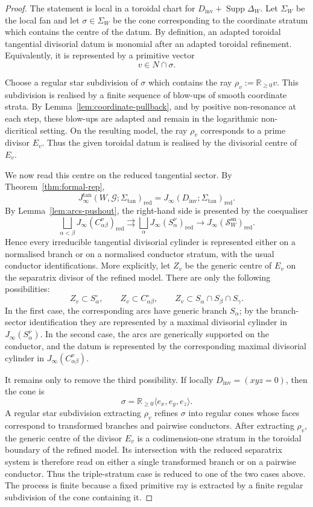 \documentclass[11pt]{amsart}
\numberwithin{equation}{section}
\theoremstyle{plain}
\theoremstyle{definition}
\newcommand{\Supp}{\operatorname{Supp}}
\newcommand{\sn}{\mathrm{sn}}
\newcommand{\Sigmatan}{\Sigma_{\mathrm{tan}}}
\newcommand{\red}{\mathrm{red}}
\newcommand{\Dinv}{D_{\mathrm{inv}}}
\newcommand{\cG}{\mathcal G}
\newcommand{\sS}{\mathscr S}
\begin{document}
 \begin{proof}
The statement is local in a toroidal chart for
\(\Dinv+\Supp\Delta_W\).  Let \(\Sigma_W\) be the local fan and let
\(\sigma\in\Sigma_W\) be the cone corresponding to the coordinate stratum
which contains the centre of the datum.  By definition, an adapted toroidal
tangential divisorial datum is monomial after an adapted toroidal refinement.
Equivalently, it is represented by a primitive vector
\[
v\in N\cap\sigma .
\]

Choose a regular star subdivision of \(\sigma\) which contains the ray
\(\rho_v:=\mathbb R_{\geq0}v\).  This subdivision is realised by a finite
sequence of blow-ups of smooth coordinate strata.  By
Lemma~\ref{lem:coordinate-pullback}, and by positive non-resonance at each
step, these blow-ups are adapted and remain in the logarithmic
non-dicritical setting.  On the resulting model, the ray \(\rho_v\)
corresponds to a prime divisor \(E_v\).  Thus the given toroidal datum is
realised by the divisorial centre of \(E_v\).

We now read this centre on the reduced tangential sector.  By
Theorem~\ref{thm:formal-rep},
\[
J_\infty^{\tan}(W,\cG;\Sigmatan)_{\red}
=
J_\infty(\Dinv;\Sigmatan)_{\red}.
\]
By Lemma~\ref{lem:arcs-pushout}, the right-hand side is presented by the
coequaliser
\[
\bigsqcup_{\alpha<\beta}J_\infty(C_{\alpha\beta}^{\nu})_{\red}
\rightrightarrows
\bigsqcup_{\alpha}J_\infty(S_\alpha^\nu)_{\red}
\longrightarrow
J_\infty(\sS_W^{\sn})_{\red}.
\]
Hence every irreducible tangential divisorial cylinder is represented either
on a normalised branch or on a normalised conductor stratum, with the usual
conductor identifications.
More explicitly, let \(Z_v\) be the generic centre of \(E_v\) on the
separatrix divisor of the refined model.  There are only the following
possibilities:
\[
Z_v\subset S_\alpha^\circ,\qquad
Z_v\subset C_{\alpha\beta}^\circ,\qquad
Z_v\subset S_\alpha\cap S_\beta\cap S_\gamma .
\]
In the first case, the corresponding arcs have generic branch \(S_\alpha\);
by the branch-sector identification they are represented by a maximal
divisorial cylinder in \(J_\infty(S_\alpha^\nu)\).  In the second case, the
arcs are generically supported on the conductor, and the datum is represented
by the corresponding maximal divisorial cylinder in
\(J_\infty(C_{\alpha\beta}^\nu)\).

It remains only to remove the third possibility.  If locally
\(\Dinv=(xyz=0)\), then the cone is
\[
\sigma=\mathbb R_{\geq0}\langle e_x,e_y,e_z\rangle .
\]
A regular star subdivision extracting \(\rho_v\) refines \(\sigma\) into
regular cones whose faces correspond to transformed branches and pairwise
conductors.  After extracting \(\rho_v\), the generic centre of the divisor
\(E_v\) is a codimension-one stratum in the toroidal boundary of the refined
model.  Its intersection with the reduced separatrix system is therefore read
on either a single transformed branch or on a pairwise conductor.  Thus the
triple-stratum case is reduced to one of the two cases above.  The process is
finite because a fixed primitive ray is extracted by a finite regular
subdivision of the cone containing it.


\end{proof}
\end{document}
